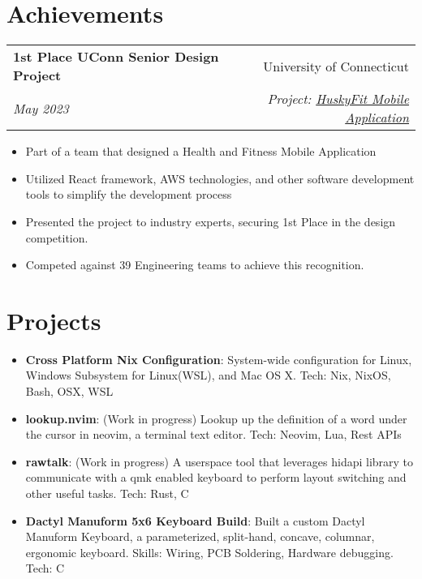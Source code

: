 \documentclass[a4paper,20pt]{article}
\makeatletter
\newcommand{\resumeItem}[2]{
  \item\small{
    \textbf{#1}{: #2 \vspace{-2pt}}
  }
}
\newcommand{\resumeItemCustom}[2]{
  \item\small{
    \textbf{#1}{ #2 \vspace{-2pt}}
  }
}
\newcommand{\resumeSubheading}[4]{
  \vspace{-1pt}\item
    \begin{tabular*}{0.97\textwidth}{l@{\extracolsep{\fill}}r}
      \textbf{#1} & #2 \\
      \textit{#3} & \textit{#4} \\
    \end{tabular*}\vspace{-5pt}
}
\newcommand{\resumeSubItem}[2]{\resumeItem{#1}{#2}\vspace{-3pt}}
\newcommand{\resumeSubHeadingListStart}{\begin{itemize}[leftmargin=*]}
\newcommand{\resumeSubHeadingListEnd}{\end{itemize}}
\newcommand{\resumeItemListStart}{\begin{itemize}}
\newcommand{\resumeItemListEnd}{\end{itemize}\vspace{-5pt}}
\makeatother
\begin{document}
\section{Achievements}
    \resumeSubheading
            {1st Place UConn Senior Design Project}
		{University of Connecticut}{May 2023}
            {Project: \href{https://seniordesignday.engr.uconn.edu/seniorprojectpt/senior-design-2023-computer-science-and-engineering-team-05/}{HuskyFit Mobile Application}}
		\resumeItemListStart
        \resumeItemCustom{}{Part of a team that designed a Health and Fitness Mobile Application}
        \resumeItemCustom{}{Utilized React framework, AWS technologies, and other software development tools to simplify the development process }
        \resumeItemCustom{}{Presented the project to industry experts, securing 1st Place in the design competition.}
        \resumeItemCustom{}{Competed against 39 Engineering teams to achieve this recognition.}
		\resumeItemListEnd

\vspace{5pt}
\section{Projects}
\vspace{5pt}
\resumeSubHeadingListStart
\resumeSubItem{Cross Platform Nix Configuration}{System-wide configuration for Linux, Windows Subsystem for Linux(WSL), and Mac OS X.  Tech: Nix, NixOS, Bash, OSX, WSL}
\vspace{2pt}
\resumeSubItem{lookup.nvim}{ (Work in progress) Lookup up the definition of a word under the cursor in neovim, a terminal text editor. Tech: Neovim, Lua, Rest APIs}
\vspace{2pt}
\resumeSubItem{rawtalk}{ (Work in progress) A userspace tool that leverages hidapi library to communicate with a qmk enabled keyboard to perform layout switching and other useful tasks. Tech: Rust, C}
\vspace{2pt}
\resumeSubItem{Dactyl Manuform 5x6 Keyboard Build}{Built a custom Dactyl Manuform Keyboard, a parameterized, split-hand, concave, columnar, ergonomic keyboard. Skills: Wiring, PCB Soldering, Hardware debugging. Tech: C}
\vspace{2pt}
\resumeSubHeadingListEnd
\end{document}
